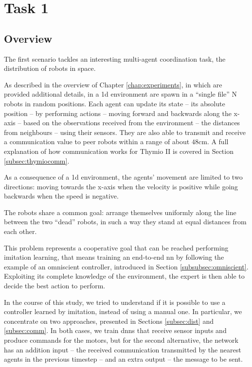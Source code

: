 \section{Task 1}
\label{sec:task1}

\subsection{Overview}
\label{subsec:desc1}

The first scenario tackles an interesting multi-agent coordination task, the 
distribution of robots in space.

As described in the overview of Chapter \ref{chap:experiments}, in which are 
provided additional details, in a \gls{1d} environment are spawn in a ``single 
file'' N robots in random positions. %
Each agent can update its state – its absolute position – by performing actions – 
moving forward and backwards along the x-axis – based on the observations 
received from the environment – the distances from neighbours – using their 
sensors.  They are also able to transmit and receive a communication value to 
peer robots within a range of about $48$\gls{cm}. 
A full explanation of how communication works for Thymio II is covered in 
Section \ref{subsec:thymiocomm}.

As a consequence of a \gls{1d} environment, the agents' movement are 
limited to two directions: moving towards the x-axis when the velocity is positive 
while going backwards when the speed is negative. 

The robots share a common goal: arrange themselves uniformly along the 
line between the two ``dead'' robots, in such a way they stand at equal distances 
from each other.


This problem represents a cooperative goal that can be reached performing 
imitation learning, that means training an end-to-end \gls{nn} by following 
the example of an omniscient controller, introduced in Section 
\ref{subsubsec:omniscient}.
Exploiting its complete knowledge of the environment, %
the expert is then able to decide the best action to perform.

In the course of this study, we tried to understand if it is possible to use a 
controller learned by imitation, instead of using a manual one. In particular, we 
concentrate on two approaches, presented in Sections \ref{subsec:dist} and 
\ref{subsec:comm}.
In both cases, we train \glspl{dnn} that receive sensor inputs and produce 
commands for the motors, but for the second alternative, the network has an 
addition input – the received communication transmitted by the nearest agents in 
the previous timestep – and an extra output – the message to be sent.


